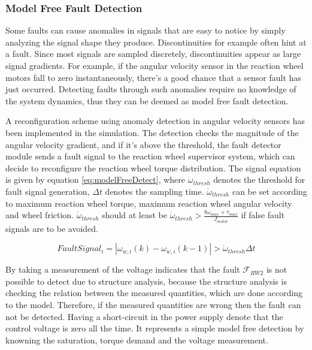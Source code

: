 \subsubsection{Model Free Fault Detection}
\label{sec:ModelFreeFD}

Some faults can cause anomalies in signals that are easy to notice by simply analyzing the signal shape they produce. Discontinuities for example often hint at a fault. Since most signals are sampled discretely, discontinuities appear as large signal gradients. For example, if the angular velocity sensor in the reaction wheel motors fall to zero instantaneously, there's a good chance that a sensor fault has just occurred. Detecting faults through such anomalies require no knowledge of the system dynamics, thus they can be deemed as model free fault detection. 

A reconfiguration scheme using anomaly detection in angular velocity sensors has been implemented in the simulation. The detection checks the magnitude of the angular velocity gradient, and if it's above the threshold, the fault detector module sends a fault signal to the reaction wheel supervisor system, which can decide to reconfigure the reaction wheel torque distribution. The signal equation is given by equation \ref{eq:modelFreeDetect}, where $\dot{\omega}_{thresh}$ denotes the threshold for fault signal generation, $\Delta t$ denotes the sampling time.  $\dot{\omega}_{thresh}$ can be set according to maximum reaction wheel torque, maximum reaction wheel angular velocity and wheel friction. $\dot{\omega}_{thresh}$ should at  least be $\dot{\omega}_{thresh} > \frac{b \omega_{max} + \tau_{max}}{J_{motor}}$ if false fault signals are to be avoided.

\begin{equation}
\label{eq:modelFreeDetect}
FaultSignal_i = |\omega_{w,i}(k) - \omega_{w,i}(k-1)| > \dot{\omega}_{thresh} \Delta t
\end{equation}

By taking a measurement of the voltage indicates that the fault $\mathcal{F}_{RW2}$ is not possible to detect due to structure analysis, because the structure analysis is checking the relation between the measured quantities, which are done according to the model. Therefore, if the measured quantities are wrong then the fault can not be detected.  Having a short-circuit in the power supply denote that the control voltage is zero all the time. It represents a simple model free detection by knowning the saturation, torque demand and the voltage measurement.

